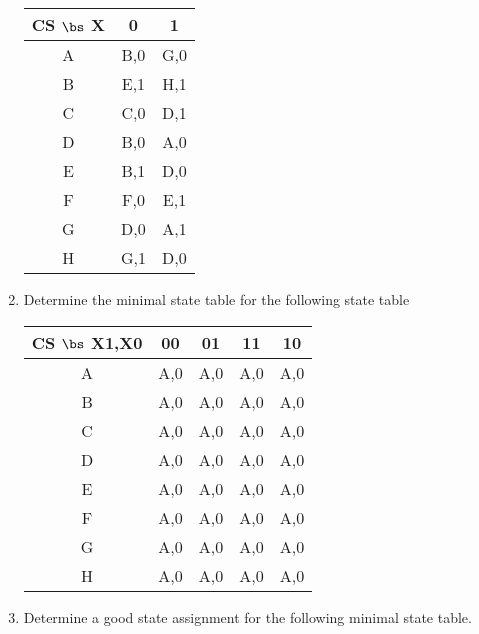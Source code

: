 \begin{enumerate}
        \begin{tabular}{c||c|c}
            CS $\bs$ X&  0    &  1 \\ \hline \hline
            A   &  B,0  &  G,0 \\ \hline
            B   &  E,1  &  H,1 \\ \hline
            C   &  C,0  &  D,1 \\ \hline
            D   &  B,0  &  A,0 \\ \hline
            E   &  B,1  &  D,0 \\ \hline
            F   &  F,0  &  E,1 \\ \hline
            G   &  D,0  &  A,1 \\ \hline
            H   &  G,1  &  D,0 \\
        \end{tabular}

    \item Determine the minimal state table for the following state table

        \begin{tabular}{c||c|c|c|c}
            CS $\bs$ X1,X0& 00    & 01    & 11    & 10    \\ \hline
            A    & A,0    & A,0    & A,0    & A,0    \\ \hline
            B    & A,0    & A,0    & A,0    & A,0    \\ \hline
            C    & A,0    & A,0    & A,0    & A,0    \\ \hline
            D    & A,0    & A,0    & A,0    & A,0    \\ \hline
            E    & A,0    & A,0    & A,0    & A,0    \\ \hline
            F    & A,0    & A,0    & A,0    & A,0    \\ \hline
            G    & A,0    & A,0    & A,0    & A,0    \\ \hline
            H    & A,0    & A,0    & A,0    & A,0    \\
        \end{tabular}

    \item Determine a good state assignment for the following minimal state
        table.


\end{enumerate}
